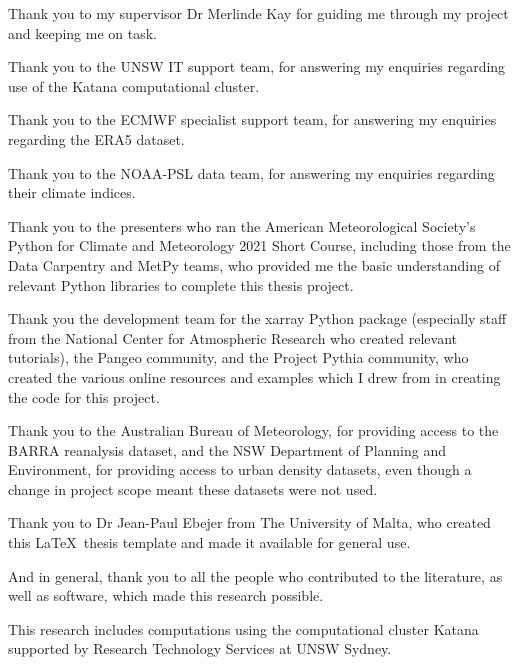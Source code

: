 \begin{acknowledgements}
Thank you to my supervisor Dr Merlinde Kay for guiding me through my project and keeping me on task. 

Thank you to the UNSW IT support team, for answering my enquiries regarding use of the Katana computational cluster.

Thank you to the ECMWF specialist support team, for answering my enquiries regarding the ERA5 dataset.

Thank you to the NOAA-PSL data team, for answering my enquiries regarding their climate indices.

Thank you to the presenters who ran the American Meteorological Society's Python for Climate and Meteorology 2021 Short Course, including those from the Data Carpentry and MetPy teams, who provided me the basic understanding of relevant Python libraries to complete this thesis project. 

Thank you the development team for the xarray Python package (especially staff from the National Center for Atmospheric Research who created relevant tutorials), the Pangeo community, and the Project Pythia community, who created the various online resources and examples which I drew from in creating the code for this project. 

Thank you to the Australian Bureau of Meteorology, for providing access to the BARRA reanalysis dataset, and the NSW Department of Planning and Environment, for providing access to urban density datasets, even though a change in project scope meant these datasets were not used.

Thank you to Dr Jean-Paul Ebejer from The University of Malta, who created this \LaTeX \ thesis template and made it available for general use.

And in general, thank you to all the people who contributed to the literature, as well as software, which made this research possible.

This research includes computations using the computational cluster Katana supported by Research Technology Services at UNSW Sydney.
\end{acknowledgements}
